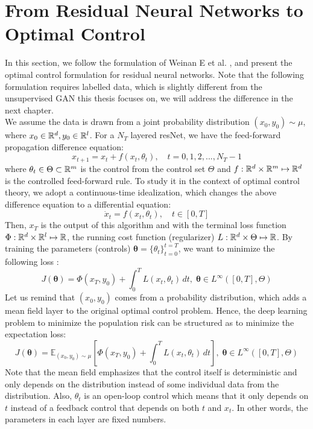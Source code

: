 \section{From Residual Neural Networks to Optimal Control}
\label{resNet}
In this section, we follow the formulation of Weinan E et al. \cite{weinan2018mean}, and present the optimal control formulation for residual neural networks. Note that the following formulation requires labelled data, which is slightly different from the unsupervised GAN this thesis focuses on, we will address the difference in the next chapter.\\
We assume the data is drawn from a joint probability distribution $(x_0,y_0) \sim  \mu$, where $x_0 \in \mathbb{R}^d , y_0 \in \mathbb{R}^l$. For a $N_T$ layered resNet, we have the feed-forward propagation difference equation: 
$$ x_{t+1} = x_{t} + f(x_t,\theta_t), \quad t = 0,1,2,...,N_T-1$$
where $\theta_t \in \Theta \subset \mathbb{R}^m$ is the control from the control set $\Theta$ and $f: \mathbb{R}^d \times \mathbb{R}^m \mapsto \mathbb{R}^d$ is the controlled feed-forward rule. To study it in the context of optimal control theory, we adopt a continuous-time idealization, which changes the above difference equation to a differential equation:$$ \dot x_{t} =f(x_t,\theta_t), \quad t \in [0,T] $$
Then, $x_T$ is the output of this algorithm and with the terminal loss function $\Phi : \mathbb{R}^d \times \mathbb{R}^l \mapsto \mathbb{R}$, the running cost function (regularizer) $L:\mathbb{R}^d \times \Theta \mapsto \mathbb{R}$. By training the parameters (controls) $\bm{\theta} = \{\theta_t\}_{t = 0}^{t = T}$, we want to minimize the following loss :
$$J(\bm{\theta}) = \Phi (x_T,y_0)+ \int_{0}^{T} L(x_t, \theta_t) \,dt, \; \bm{\theta} \in L^{\infty}([0,T],\Theta) $$
Let us remind that $(x_0,y_0)$ comes from a probability distribution, which adds a mean field layer to the original optimal control problem. Hence, the deep learning problem to minimize the population risk can be structured as to minimize the expectation loss:\begin{equation}
    \label{eq:1}
    J(\bm{\theta}) = \mathbb{E}_{(x_0,y_0) \sim \mu}\left[\Phi (x_T,y_0)+ \int_{0}^{T} L(x_t, \theta_t)\, dt\right], \; \bm{\theta} \in L^{\infty}([0,T],\Theta)
\end{equation} Note that the mean field emphasizes that the control itself is deterministic and only depends on the distribution instead of some individual data from the distribution. Also, $\theta_t$ is an open-loop control which means that it only depends on $t$ instead of a feedback control that depends on both $t$ and $x_t$. In other words, the parameters in each layer are fixed numbers.

